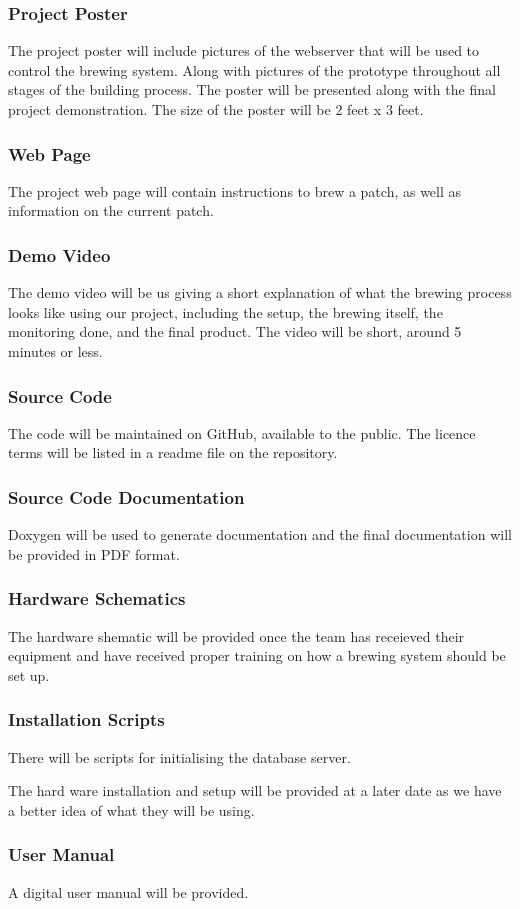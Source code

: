 \subsubsection{Project Poster}
The project poster will include pictures of the webserver that will be used to control the brewing system. Along with pictures of the prototype throughout all stages of the building process. The poster will be presented along with the final project demonstration. The size of the poster will be 2 feet x 3 feet.

\subsubsection{Web Page}

The project web page will contain instructions to brew a patch, as well as information on the current patch.

\subsubsection{Demo Video}
The demo video will be us giving a short explanation of what the brewing process looks like using our project, including the setup, the brewing itself, the monitoring done, and the final product. The video will be short, around 5 minutes or less.

\subsubsection{Source Code}

The code will be maintained on GitHub, available to the public. The licence terms will be listed in a readme file on the repository.

\subsubsection{Source Code Documentation}


Doxygen will be used to generate documentation and the final documentation will be provided in PDF format.

\subsubsection{Hardware Schematics}
The hardware shematic will be provided once the team has receieved their equipment and have received proper training on how a brewing system should be set up. 



\subsubsection{Installation Scripts}
There will be scripts for initialising the database server. 

The hard ware installation and setup will be provided at a later date as we have a better idea of what they will be using.


\subsubsection{User Manual}

A digital user manual will be provided.
